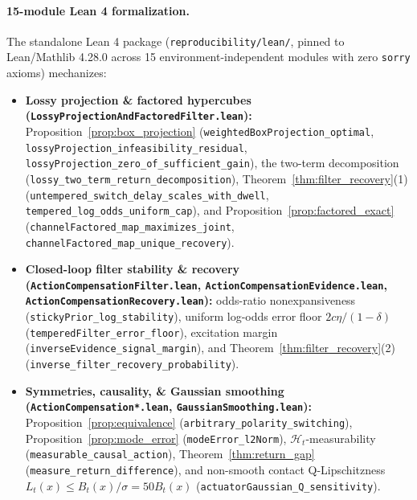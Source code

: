 \paragraph{15-module Lean 4 formalization.}
The standalone Lean 4 package (\texttt{reproducibility/\allowbreak lean/}, pinned to Lean/Mathlib 4.28.0 across 15 environment-independent modules with zero \texttt{sorry} axioms) mechanizes:
\begin{itemize}[leftmargin=*]
    \item \textbf{Lossy projection \& factored hypercubes (\texttt{LossyProjection\allowbreak AndFactored\allowbreak Filter.lean}):} Proposition~\ref{prop:box_projection} (\texttt{weightedBoxProjection\_\allowbreak optimal}, \texttt{lossyProjection\_\allowbreak infeasibility\_\allowbreak residual}, \texttt{lossyProjection\_\allowbreak zero\_\allowbreak of\_\allowbreak sufficient\_\allowbreak gain}), the two-term decomposition (\texttt{lossy\_\allowbreak two\_\allowbreak term\_\allowbreak return\_\allowbreak decomposition}), Theorem~\ref{thm:filter_recovery}(1) (\texttt{untempered\_\allowbreak switch\_\allowbreak delay\_\allowbreak scales\_\allowbreak with\_\allowbreak dwell}, \texttt{tempered\_\allowbreak log\_\allowbreak odds\_\allowbreak uniform\_\allowbreak cap}), and Proposition~\ref{prop:factored_exact} (\texttt{channelFactored\_\allowbreak map\_\allowbreak maximizes\_\allowbreak joint}, \texttt{channelFactored\_\allowbreak map\_\allowbreak unique\_\allowbreak recovery}).
    \item \textbf{Closed-loop filter stability \& recovery (\texttt{ActionCompensation\allowbreak Filter.lean}, \texttt{ActionCompensation\allowbreak Evidence.lean}, \texttt{ActionCompensation\allowbreak Recovery.lean}):} odds-ratio nonexpansiveness (\texttt{stickyPrior\_\allowbreak log\_\allowbreak stability}), uniform log-odds error floor $2c\eta/(1-\delta)$ (\texttt{temperedFilter\_\allowbreak error\_\allowbreak floor}), excitation margin (\texttt{inverseEvidence\_\allowbreak signal\_\allowbreak margin}), and Theorem~\ref{thm:filter_recovery}(2) (\texttt{inverse\_\allowbreak filter\_\allowbreak recovery\_\allowbreak probability}).
    \item \textbf{Symmetries, causality, \& Gaussian smoothing (\texttt{ActionCompensation*.lean}, \texttt{Gaussian\allowbreak Smoothing.lean}):} Proposition~\ref{prop:equivalence} (\texttt{arbitrary\_\allowbreak polarity\_\allowbreak switching}), Proposition~\ref{prop:mode_error} (\texttt{modeError\_\allowbreak l2Norm}), $\mathcal{H}_t$-measurability (\texttt{measurable\_\allowbreak causal\_\allowbreak action}), Theorem~\ref{thm:return_gap} (\texttt{measure\_\allowbreak return\_\allowbreak difference}), and non-smooth contact Q-Lipschitzness $L_t(x)\le B_t(x)/\sigma=50 B_t(x)$ (\texttt{actuatorGaussian\_\allowbreak Q\_\allowbreak sensitivity}).
\end{itemize}

